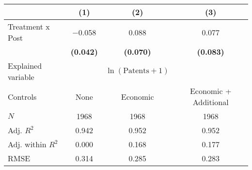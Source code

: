 
\begin{tabular}[t]{lccc}
\toprule
  & (1) & (2) & (3)\\
\midrule
Treatment x Post & \num{-0.058} & \num{0.088} & \num{0.077}\\
\textbf{} & \textbf{(\num{0.042})} & \textbf{(\num{0.070})} & \textbf{(\num{0.083})}\\
\midrule
Explained variable &  & $\ln(\text{Patents}+1)$ & \\
Controls & None & Economic & Economic + Additional\\
$N$ & \num{1968} & \num{1968} & \num{1968}\\
Adj. $R^2$ & \num{0.942} & \num{0.952} & \num{0.952}\\
Adj. within $R^2$ & \num{0.000} & \num{0.168} & \num{0.177}\\
RMSE & \num{0.314} & \num{0.285} & \num{0.283}\\
\bottomrule
\end{tabular}
